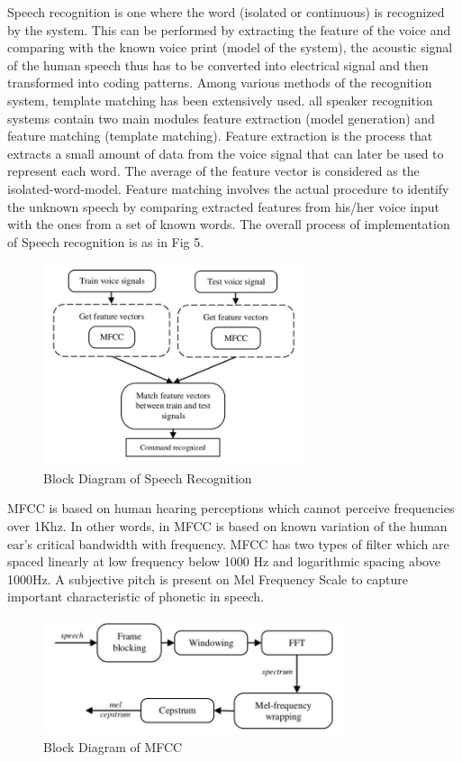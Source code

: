\documentclass[journal,twoside]{IEEEtran}
\begin{document}
Speech recognition is one where the word (isolated or
continuous) is recognized by the system. This can be
performed by extracting the feature of the voice and
comparing with the known voice print (model of the system),
the acoustic signal of the human speech thus has to be
converted into electrical signal and then transformed into
coding patterns. Among various methods of the recognition
system, template matching has been extensively used. all
speaker recognition systems contain two main modules feature
extraction (model generation) and feature matching (template
matching). Feature extraction is the process that extracts a
small amount of data from the voice signal that can later be
used to represent each word. The average of the feature vector
is considered as the isolated-word-model. Feature matching
involves the actual procedure to identify the unknown speech
by comparing extracted features from his/her voice input with
the ones from a set of known words. \cite{Holmes2001} The overall process
of implementation of Speech recognition is as in Fig 5.

\begin{figure}[H]
\centering
\includegraphics[width=3.0in]{figure5}
\caption{Block Diagram of Speech Recognition}
\label{fig:figure5}
\end{figure}

MFCC is based on human hearing perceptions which cannot
perceive frequencies over 1Khz. In other words, in MFCC is
based on known variation of the human ear’s critical
bandwidth with frequency. MFCC has two types of filter
which are spaced linearly at low frequency below 1000 Hz
and logarithmic spacing above 1000Hz. A subjective pitch is
present on Mel Frequency Scale to capture important
characteristic of phonetic in speech. \cite{Gopi2014}

\begin{figure}[H]
\centering
\includegraphics[width=3.5in]{figure6}
\caption{Block Diagram of MFCC}
\label{fig:figure6}
\end{figure}
\end{document}
